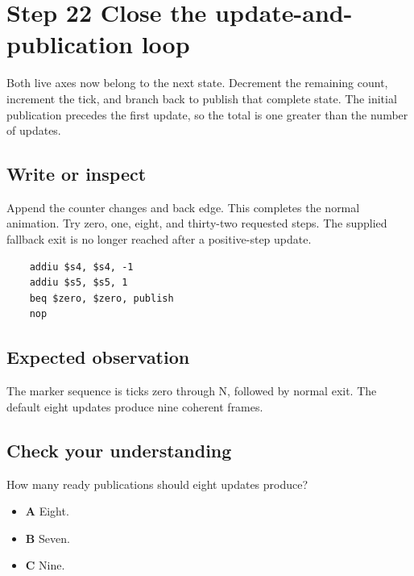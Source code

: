 \section{Step 22 Close the update-and-publication loop}\label{ball-s22}

Both live axes now belong to the next state. Decrement the remaining count, increment the tick, and branch back to publish that complete state. The initial publication precedes the first update, so the total is one greater than the number of updates.

\subsection{Write or inspect}
Append the counter changes and back edge. This completes the normal animation. Try zero, one, eight, and thirty-two requested steps. The supplied fallback exit is no longer reached after a positive-step update.

\begin{verbatim}
    addiu $s4, $s4, -1
    addiu $s5, $s5, 1
    beq $zero, $zero, publish
    nop
\end{verbatim}

\subsection{Expected observation}
The marker sequence is ticks zero through N, followed by normal exit. The default eight updates produce nine coherent frames.

\subsection{Check your understanding}
How many ready publications should eight updates produce?

\begin{itemize}
  \item \textbf{A} Eight.
  \item \textbf{B} Seven.
  \item \textbf{C} Nine.
\end{itemize}
